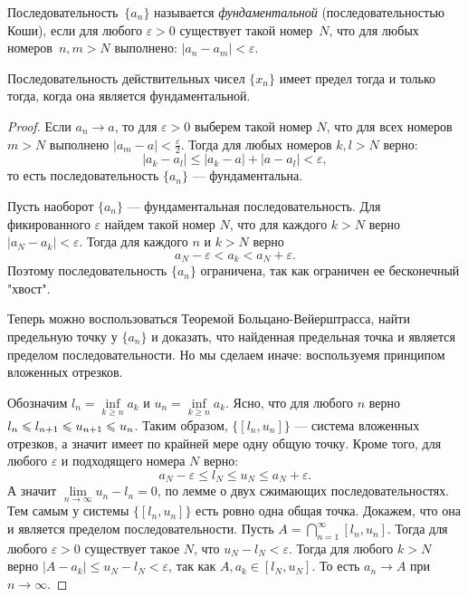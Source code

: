 \begin{defin}
	Последовательность~\(\{a_n\}\) называется \textit{фундаментальной} (последовательностью Коши), если для любого \(\varepsilon>0\) существует такой номер~\(N\), что для любых номеров~\(n, m > N\) выполнено: \(|a_n-a_m| < \varepsilon\).
\end{defin}

\begin{theorem}
	Последовательность действительных чисел \(\{x_n\}\) имеет предел тогда и только тогда, когда она является фундаментальной.
\end{theorem}
\begin{proof}
	Если \(a_n\to a\), то для \(\varepsilon>0\) выберем такой номер \(N\), что для всех номеров \(m>N\) выполнено \(|a_m-a|<\frac{\varepsilon}{2}\). Тогда для любых номеров \(k, l > N\) верно:
	\[|a_k-a_l| \leqslant |a_k - a| + |a - a_l| < \varepsilon,\]
	то есть последовательность \(\{a_n\}\) --- фундаментальна.
	
	Пусть наоборот \(\{a_n\}\) --- фундаментальная последовательность. Для фикированного \(\varepsilon\) найдем такой номер \(N\), что для каждого \(k>N\) верно \(|a_{N} - a_k|<\varepsilon\). Тогда для каждого \(n\) и \(k>N\) верно \[a_{N} - \varepsilon<a_k<a_{N} + \varepsilon.\] 
	Поэтому последовательность \(\{a_n\}\) ограничена, так как ограничен ее бесконечный "хвост".
	
	{\footnotesize Теперь можно воспользоваться Теоремой Больцано-Вейерштрасса, найти предельную точку у \(\{a_n\}\) и доказать, что найденная предельная точка и является пределом последовательности. Но мы сделаем иначе: воспользуемя принципом вложенных отрезков.}
	
	Обозначим \(l_n = \inf\limits_{k\geqslant n}a_k\) и \(u_n = \inf\limits_{k\geqslant n}a_k\). Ясно, что для любого \(n\) верно \(l_n\hm\leqslant l_{n+1}\hm\leqslant u_{n+1}\hm\leqslant u_n\). Таким образом, \(\{[l_n, u_n]\}\) --- система вложенных отрезков, а значит имеет по крайней мере одну общую точку. Кроме того, для любого \(\varepsilon\) и подходящего номера \(N\) верно:
	\[a_N - \varepsilon \leqslant l_N \leqslant u_N\leqslant a_N + \varepsilon.\]
	А значит \(\lim\limits_{n\to\infty}u_n - l_n = 0\), по лемме о двух сжимающих последовательностях. Тем самым у системы \(\{[l_n, u_n]\}\) есть ровно одна общая точка. Докажем, что она и является пределом последовательности.
	Пусть \(A = \bigcap\limits_{n=1}^{\infty}[l_n, u_n]\). Тогда для любого \(\varepsilon>0\) существует такое \(N\), что \(u_N - l_N <\varepsilon\). Тогда для любого \(k > N\) верно \(|A - a_k| \leqslant u_N - l_N < \varepsilon \), так как \(A, a_k\in[l_N, u_N]\). То есть \(a_n\to A\) при \(n\to\infty\).
\end{proof}